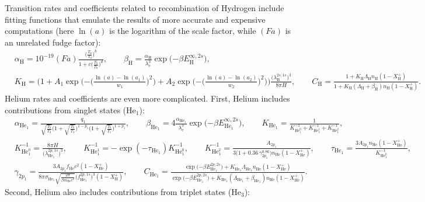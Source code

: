 \documentclass{aa}
\newcommand\el{\mathrm{e}} %
\newcommand\Hy{\mathrm{H}} %
\newcommand\He{\mathrm{He}} %
\newcommand\Hesin{{\mathrm{He}_1}} %
\newcommand\Hetri{{\mathrm{He}_3}} %
\begin{document}
Transition rates and coefficients related to recombination of Hydrogen include fitting functions that emulate the results of more accurate and expensive computations (here $\ln(a)$ is the logarithm of the scale factor, while $(Fa)$ is an unrelated fudge factor):
\begin{align*}
&
\alpha_\Hy = 10^{-19} (Fa) \frac{\Big( \frac{T_b}{T_0} \Big)^b }{ 1 + c \Big(\frac{T_b}{T_0}\Big)^d }, \qquad
\beta_\Hy = \frac{\alpha_\Hy}{\lambda_\el^3} \exp\big({-\beta E_\Hy^{\infty,2s}}\big), \\
&
K_\Hy = \Bigg( 1 + A_1 \exp\Bigg({-\bigg(\frac{\ln(a)-\ln(a_1)}{w_1}\bigg)^2}\Bigg) + A_2 \exp\Bigg({-\bigg(\frac{\ln(a)-\ln(a_2)}{w_2}\bigg)^2}\Bigg) \Bigg) \frac{\big(\lambda_\Hy^{2s,1s}\big)^3}{8\pi H}, \qquad
C_\Hy = \frac{1 + K_\Hy \Lambda_\Hy n_\Hy (1-X_\Hy^+) }{ 1 + K_\Hy (\Lambda_\Hy+\beta_\Hy) n_\Hy (1-X_\Hy^+) }.
\end{align*}
Helium rates and coefficients are even more complicated. First, Helium includes contributions from singlet states ($\Hesin$):
\begin{align*}
&
\alpha_\Hesin = \frac{q_1 }{ \sqrt{\frac{T_b}{T_2}} \Big(1+\sqrt{\frac{T_b}{T_2}}\Big)^{1-p_1} \Big(1+\sqrt{\frac{T_b}{T_1}}\Big)^{1+p_1} }, \qquad
\beta_\Hesin = 4 \frac{\alpha_\Hesin }{ \lambda_\el^3 } \exp\big({-β E_\Hesin^{\infty,2s}}\big), \qquad
K_\Hesin = \frac{1}{K_{\He_1^0}^{-1} + K_{\He_1^1}^{-1} + K_{\He_1^2}^{-1}}, \\
&
K_{\He_1^0}^{-1} = \frac{8 \pi H }{ \big(\lambda_\Hesin^{2p,1s}\big)^3 }, \qquad
K_{\He_1^1}^{-1} = -\exp(-\tau_\Hesin) K_{\He_1^0}^{-1}, \qquad
K_{\He_1^2}^{-1} = \frac{A_{2p_1} }{ 3 \big(1+0.36 \, \gamma_{2p_1}^{0.86}\big) n_\He (1-X_\He^+) }, \qquad
\tau_\Hesin = \frac{ 3 A_{2p_1} n_\He (1-X_\He^+) }{ K_{\He_1^0}^{-1} }, \\
&
\gamma_{2p_1} = \frac{ 3 A_{2p_1} f_\He c^2 (1-X_\He^+) }{ 8\pi \sigma_{\Hesin} \sqrt{\frac{2 \pi}{\beta m_\He c^2}} \big(f_\Hesin^{2p,1s}\big)^3 (1-X_\Hy^+) }, \qquad
C_\Hesin = \frac{\exp\big({-\beta E_\Hesin^{2p,2s}}\big) + K_\Hesin \Lambda_\Hesin n_\He (1-X_\He^+) }{ \exp\big({-\beta E_\Hesin^{2p,2s}}\big) + K_\Hesin (\Lambda_\Hesin+\beta_\Hesin) n_\He (1-X_\He^+) }.
\end{align*}
Second, Helium also includes contributions from triplet states ($\Hetri$):
\end{document}
